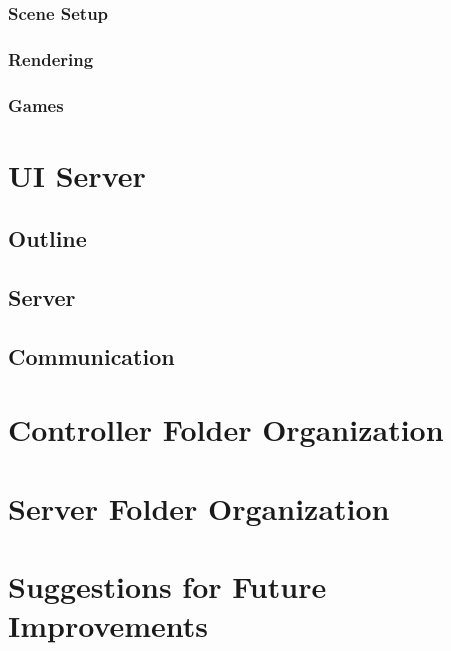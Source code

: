 \documentclass{article}
\begin{document}
	\subsubsection{Scene Setup}
	\subsubsection{Rendering}
	\subsubsection{Games}
	
\section{UI Server}
	\subsection{Outline}
	\subsection{Server}
	\subsection{Communication}

\section{Controller Folder Organization}
\section{Server Folder Organization}

\section{Suggestions for Future Improvements}
		
\end{document}
